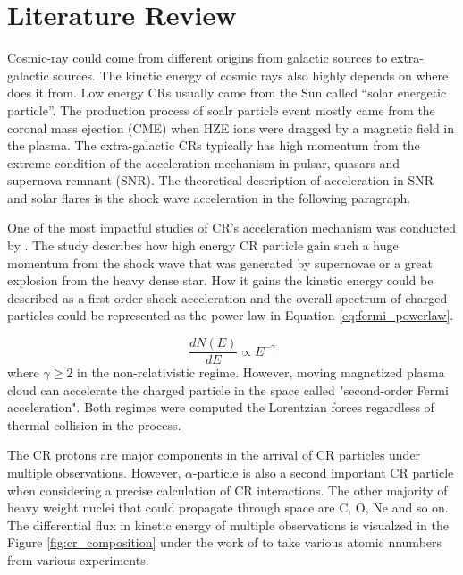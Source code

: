 \chapter{Literature Review}


Cosmic-ray could come from different origins from galactic sources
to extra-galactic sources. The kinetic energy of cosmic rays also 
highly depends on where does it from. Low energy CRs usually came from 
the Sun called ``solar energetic particle''. The production process of 
soalr particle event mostly came from the coronal mass ejection (CME)
when HZE ions were dragged by a magnetic field in the plasma.
The extra-galactic CRs typically 
has high momentum from the extreme condition of the acceleration mechanism
in pulsar, quasars and supernova remnant (SNR). 
The theoretical description of acceleration in SNR and solar flares
is the shock wave acceleration in the following paragraph.

One of the most impactful studies of CR's acceleration mechanism 
was conducted by \cite{fermi1949origin}. 
The study describes how high energy CR particle gain such a huge 
momentum from the shock wave that was generated by supernovae 
or a great explosion from the heavy dense star. How it gains
the kinetic energy could be described as a first-order shock 
acceleration and the overall spectrum of charged particles could be
represented as the power law in Equation \ref{eq:fermi_powerlaw}.

\begin{equation}
    \frac{dN(E)}{dE} \propto E^{-\gamma}
    \label{eq:fermi_powerlaw}
\end{equation}
where $\gamma \geq 2$ in the non-relativistic regime.
However, moving magnetized plasma cloud can accelerate the charged particle in the space called "second-order Fermi acceleration".
Both regimes were computed the Lorentzian forces regardless of thermal collision in the process.

The CR protons are major components in the arrival of CR particles under multiple observations. However, $\alpha$-particle is also 
a second important CR particle when considering a precise calculation
of CR interactions. The other majority of heavy weight nuclei that could propagate through space are C, O, Ne and so on. 
The differential flux in kinetic energy of multiple observations is 
visualzed in the Figure \ref{fig:cr_composition} under the work of 
\cite{review_particle_physics2012} to take various atomic nnumbers 
from various experiments.

